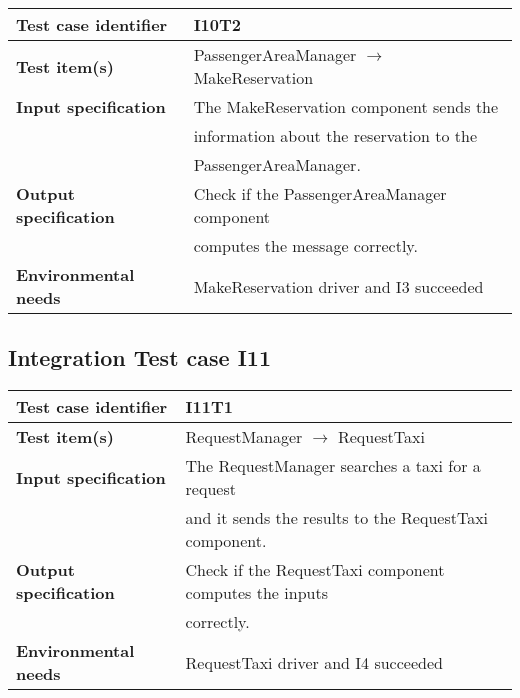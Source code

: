 		\vspace{1cm}
		\noindent
		\begin{adjustbox}{max width=\textwidth}
			\begin{tabular}{ l l}
				\hline 		\textbf{Test case identifier} & I10T2 \\
				\hline		\textbf{Test item(s)}  & PassengerAreaManager $\rightarrow$ MakeReservation \\
				\hline		\textbf{Input specification} & The MakeReservation component sends the\\& information about the reservation to the\\& PassengerAreaManager.\\
				\hline		\textbf{Output specification} &  Check if the PassengerAreaManager component\\& computes the message correctly.\\
				\hline		\textbf{Environmental needs} & MakeReservation driver and I3 succeeded\\
				\hline
			\end{tabular}
		\end{adjustbox}
			
	\hypertarget{chapter 3.11}{ }
	\subsection{Integration Test case I11}
		\begin{adjustbox}{max width=\textwidth}
			\begin{tabular}{ l l}
				\hline 		\textbf{Test case identifier} & I11T1 \\
				\hline		\textbf{Test item(s)}  & RequestManager $\rightarrow$ RequestTaxi \\
				\hline		\textbf{Input specification} & The RequestManager searches a taxi for a request\\ & and it sends the results to the RequestTaxi component.\\
				\hline		\textbf{Output specification} & Check if the RequestTaxi component computes the inputs\\ & correctly.\\
				\hline		\textbf{Environmental needs} & RequestTaxi driver and I4 succeeded\\
				\hline
			\end{tabular}
		\end{adjustbox}
		
		\vspace{1cm}
		
